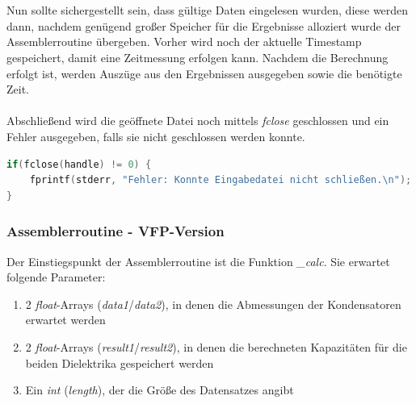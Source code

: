 \documentclass[11pt]{scrartcl}
\begin{document}
\\\\
Nun sollte sichergestellt sein, dass gültige Daten eingelesen wurden, diese werden dann, nachdem genügend großer Speicher für die Ergebnisse alloziert wurde der Assemblerroutine übergeben. Vorher wird noch der aktuelle Timestamp gespeichert, damit eine Zeitmessung erfolgen kann. Nachdem die Berechnung erfolgt ist, werden Auszüge aus den Ergebnissen ausgegeben sowie die benötigte Zeit.
\\\\
Abschließend wird die geöffnete Datei noch mittels \emph{fclose} geschlossen und ein Fehler ausgegeben, falls sie nicht geschlossen werden konnte.
\begin{lstlisting}[language=C]
if(fclose(handle) != 0) {
	fprintf(stderr, "Fehler: Konnte Eingabedatei nicht schließen.\n");
}
\end{lstlisting}

\subsubsection{Assemblerroutine - VFP-Version}
Der Einstiegspunkt der Assemblerroutine ist die Funktion \emph{\_calc}. Sie erwartet folgende Parameter:
\begin{enumerate}
\item 2 \emph{float}-Arrays (\emph{data1}/\emph{data2}), in denen die Abmessungen der Kondensatoren erwartet werden
\item 2 \emph{float}-Arrays (\emph{result1}/\emph{result2}), in denen die berechneten Kapazitäten für die beiden Dielektrika gespeichert werden
\item Ein \emph{int} (\emph{length}), der die Größe des Datensatzes angibt
\end{enumerate}
\end{document}
